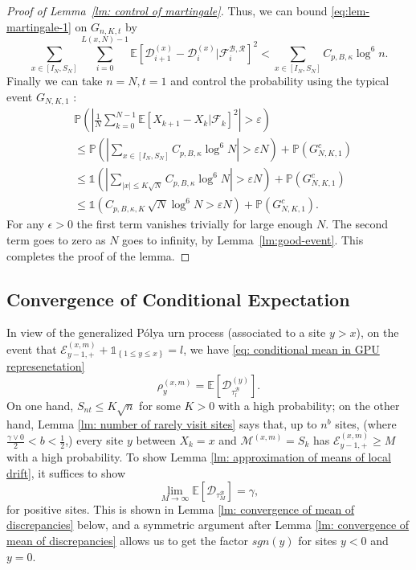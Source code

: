 \documentclass[EJP]{ejpecp} %
\begin{document}
\begin{proof}[Proof of Lemma~\ref{lm: control of martingale}]
	Thus, we can bound \eqref{eq:lem-martingale-1} on $G_{n, K, t}$ by
	\begin{equation*}
		\sum_{x \in \left[ I_N, S_N \right]} \sum_{i = 0}^{L(x,N) - 1} \mathbb{E}\left[ \mathscr{D}_{i+1}^{(x)} - \mathscr{D}_i^{(x)} | \mathcal{F}_{i}^{\mathscr{B}, \mathscr{R}} \right]^2 
		< \sum_{x \in \left[ I_N, S_N \right]} C_{p, B, \kappa} \log^6 n.
	\end{equation*}
	Finally we can take $n = N, t = 1$ and control the probability using the typical event $G_{N, K, 1}$ :
	\begin{align*}
		&\mathbb{P}\left( \left| \frac{1}{N} \sum_{k = 0}^{N-1} \mathbb{E}\left[ X_{k+1} - X_k | \mathcal{F}_k \right]^2  \right|  > \varepsilon \right)\\
		&\le \mathbb{P}\left( \left| \sum_{x \in \left[ I_N, S_N \right]} C_{p, B, \kappa} \log^6 N  \right| > \varepsilon  N \right) + \mathbb{P}\left( G_{N, K, 1}^c \right)  \\
		&\le \mathbb{1}\left(  \left| \sum_{|x| \le K \sqrt{N} } C_{p, B, \kappa} \log^6 N \right| > \varepsilon  N  \right) + \mathbb{P}\left( G_{N, K, 1}^c \right)  \\
		&\le \mathbb{1}\left(  C_{p, B, \kappa, K} \, \sqrt{N} \log^6 N > \varepsilon  N  \right) + \mathbb{P}\left( G_{N, K, 1}^c \right) 
		.\end{align*}
	For any $\epsilon > 0$ the first term vanishes trivially for large enough $N$. The second term goes to zero as $N$ goes to infinity, by Lemma~\ref{lm:good-event}. This completes the proof of the lemma.
\end{proof}



\subsection{Convergence of Conditional Expectation}
\label{sec:RhoGamma}
In view of the generalized P\'{o}lya urn process (associated to a site $y> x$), 
on the event that $\mathcal{E}^{(x,m)}_{y-1,+} +\mathbb{1}_{\left\{1\leq y\leq x\right\}} = l$, we have \eqref{eq: conditional mean in GPU represenetation} 
$$\rho^{(x,m)}_y = \mathbb{E}\left[\mathscr{D}_{\tau_l^{\mathscr{B}}}^{(y)}\right].$$ 
On one hand, $S_{nt} \leq K\sqrt{n} $ for some $K>0$ with a high probability; on the other hand, Lemma \ref{lm: number of rarely visit sites} says that, up to $n^b$ sites, (where $\frac{\gamma \vee 0}{2}<b<\frac{1}{2}$,) every site $y$ between $X_k=x$ and $\mathcal{M}^{(x,m)} =S_{k}$ has $ \mathcal{E}^{(x,m)}_{y-1,+} \geq M $ with a high probability. To show Lemma \ref{lm: approximation of means of local drift}, it suffices to show 
\begin{equation}\label{eq: convergence of conditional expectation}
	\lim_{M\to\infty} \mathbb{E}[\mathscr{D}_{\tau_M^{\mathscr{B}}}] = \gamma , 
\end{equation} for positive sites. This is shown in Lemma \ref{lm: convergence of mean of discrepancies} below, and a symmetric argument after Lemma \ref{lm: convergence of mean of discrepancies} allows us to get the factor $sgn(y)$ for sites $y<0$ and $y=0$.
\end{document}
